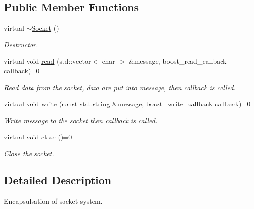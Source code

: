 \subsection*{Public Member Functions}
\begin{DoxyCompactItemize}
\item 
\hypertarget{class_socket_aeac4eb6379a543d38ed88977d3b6630a}{virtual \hyperlink{class_socket_aeac4eb6379a543d38ed88977d3b6630a}{$\sim$\-Socket} ()}\label{class_socket_aeac4eb6379a543d38ed88977d3b6630a}

\begin{DoxyCompactList}\small\item\em Destructor. \end{DoxyCompactList}\item 
virtual void \hyperlink{class_socket_a8d2e283377acc8504bdc18e0b07d8d6a}{read} (std\-::vector$<$ char $>$ \&message, boost\-\_\-read\-\_\-callback callback)=0
\begin{DoxyCompactList}\small\item\em Read data from the socket, data are put into message, then callback is called. \end{DoxyCompactList}\item 
virtual void \hyperlink{class_socket_a26aaf8ea1c9436d7d315aa58ad1c3f3b}{write} (const std\-::string \&message, boost\-\_\-write\-\_\-callback callback)=0
\begin{DoxyCompactList}\small\item\em Write message to the socket then callback is called. \end{DoxyCompactList}\item 
\hypertarget{class_socket_ad34df1e8405deab5991bf5818565ca4a}{virtual void \hyperlink{class_socket_ad34df1e8405deab5991bf5818565ca4a}{close} ()=0}\label{class_socket_ad34df1e8405deab5991bf5818565ca4a}

\begin{DoxyCompactList}\small\item\em Close the socket. \end{DoxyCompactList}\end{DoxyCompactItemize}


\subsection{Detailed Description}
Encapsulsation of socket system. 

